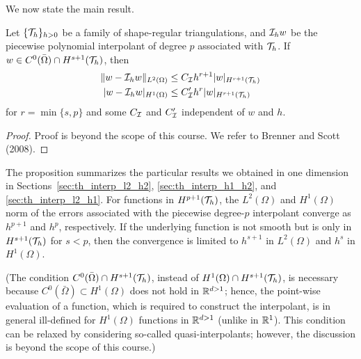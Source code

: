 We now state the main result.
\begin{proposition}
  \label{prop:th_interp_gen}
  Let $\{\mathcal{T}_h\}_{h > 0}$ be a family of shape-regular triangulations, and $\mathcal{I}_h w$ be the piecewise polynomial interpolant of degree $p$ associated with $\mathcal{T}_h$. If $w \in C^0(\bar \Omega) \cap H^{s+1}(\mathcal{T}_h)$, then %
\begin{align*}
  \| w - \mathcal{I}_h w \|_{L^2(\Omega)} &\leq C_{\mathcal{I}} h^{r+1} | w |_{H^{r+1}(\mathcal{T}_h)} \\
  | w - \mathcal{I}_h w |_{H^1(\Omega)} &\leq C'_{\mathcal{I}} h^{r} | w |_{H^{r+1}(\mathcal{T}_h)}
\end{align*}
for $r = \min\{ s,p \}$ and some $C_{\mathcal{I}}$ and $C'_{\mathcal{I}}$ independent of $w$ and $h$.
\begin{proof}
  Proof is beyond the scope of this course. We refer to Brenner and Scott (2008).
\end{proof}
\end{proposition}
The proposition summarizes the particular results we obtained in one dimension in Sections~\ref{sec:th_interp_l2_h2}, \ref{sec:th_interp_h1_h2}, and \ref{sec:th_interp_l2_h1}.  For functions in $H^{p+1}(\mathcal{T}_h)$, the $L^2(\Omega)$ and $H^1(\Omega)$ norm of the errors associated with the piecewise degree-$p$ interpolant converge as $h^{p+1}$ and $h^p$, respectively.  If the underlying function is not smooth but is only in $H^{s+1}(\mathcal{T}_h)$ for $s < p$, then the convergence is limited to $h^{s+1}$ in $L^2(\Omega)$ and $h^s$ in $H^1(\Omega)$.

(The condition $C^0(\bar \Omega) \cap H^{s+1}(\mathcal{T}_h)$, instead of $H^1(\Omega) \cap H^{s+1}(\mathcal{T}_h)$, is necessary because $C^0(\bar \Omega) \subset H^1(\Omega)$ does not hold in $\mathbb{R}^{d > 1}$; hence, the point-wise evaluation of a function, which is required to construct the interpolant, is in general ill-defined for $H^1(\Omega)$ functions in $\mathbb{R}^{d > 1}$ (unlike in $\mathbb{R}^1$). This condition can be relaxed by considering so-called quasi-interpolants; however, the discussion is beyond the scope of this course.)


